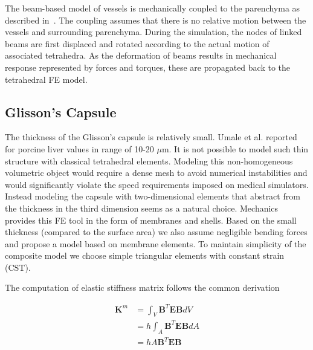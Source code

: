 \documentclass{llncs}
\newcommand{\Mat}[1]{\mathbf{#1}}
\begin{document}
The beam-based model of vessels is mechanically coupled to the parenchyma as described in~\cite{Peterlik2012}. 
The coupling assumes that there is no relative motion between the vessels and surrounding parenchyma. 
During the simulation, the nodes of linked beams are first displaced and rotated according to the actual motion of associated tetrahedra. 
As the deformation of beams results in mechanical response represented by forces and torques, these are propagated back to 
the tetrahedral FE model. 



\subsection{Glisson's Capsule} %
\label{ss:capsuleModel}
The thickness of the Glisson's capsule is relatively small. Umale et al.
\cite{Umale2011} reported for porcine liver values in range of 10-20
$\mu$m.
It is not possible to model such thin structure with classical tetrahedral
elements. Modeling this non-homogeneous volumetric object would require a
dense mesh to avoid numerical instabilities and would significantly
violate the speed requirements imposed on medical simulators.
Instead modeling the capsule with two-dimensional elements that abstract from the
thickness in the third dimension seems
as a natural choice. Mechanics provides this FE tool in the form of membranes
and shells. Based on the small thickness (compared to the surface area) we also
assume negligible bending forces and propose a model based on membrane
elements. 
To maintain simplicity of the composite model we choose simple triangular
elements with constant strain (CST).

The computation of elastic stiffness matrix follows the common derivation

\begin{eqnarray}
  \Mat{K}^m & = \int_V \Mat{B}^T \Mat{E} \Mat{B} dV     \label{mem1} \\
            & = h \int_A \Mat{B}^T \Mat{E} \Mat{B} dA   \label{mem2} \\
            & = h A \Mat{B}^T \Mat{E} \Mat{B}           \label{mem3}
\end{eqnarray}
\end{document}
